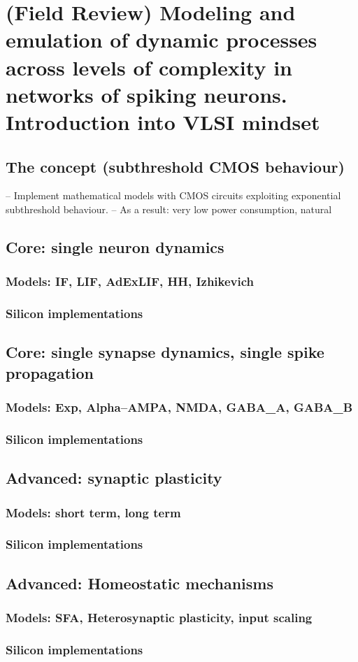 \chapter{(Field Review) Modeling and emulation of dynamic processes across levels of complexity in networks of spiking neurons. Introduction into VLSI mindset}
\label{ch:modeling_emulation}
\section{The concept (subthreshold CMOS behaviour)}

-- Implement mathematical models with CMOS circuits exploiting exponential subthreshold behaviour.
-- As a result: very low power consumption, natural

\section{Core: single neuron dynamics}
\subsection{Models: IF, LIF, AdExLIF, HH, Izhikevich}
\subsection{Silicon implementations}
\section{Core: single synapse dynamics, single spike propagation}
\subsection{Models: Exp, Alpha--AMPA, NMDA, GABA\_A, GABA\_B}
\subsection{Silicon implementations}
\section{Advanced: synaptic plasticity}
\subsection{Models: short term, long term}
\subsection{Silicon implementations}
\section{Advanced: Homeostatic mechanisms}
\subsection{Models: SFA, Heterosynaptic plasticity, input scaling}
\subsection{Silicon implementations}